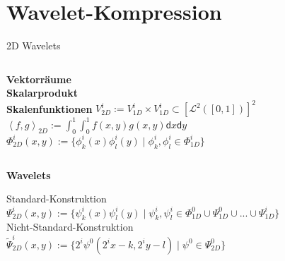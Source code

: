 \section{Wavelet-Kompression}

	\begin{frame}{2D Wavelets}
		\begin{columns}[T,onlytextwidth]
			{\bf Vektorräume}\vspace{3mm}\\
			{\bf Skalarprodukt}\vspace{3mm}\\
			{\bf Skalenfunktionen}
			\vspace{-1mm}
			$V^i_{2D}:= V^i_{1D}\times V^i_{1D}\subset\left[ \mathcal{L}^2([0,1])\right]^2$\vspace{3mm}\\
			$\left\langle f, g\right\rangle _{2D}:=\int_{0}^{1}\int_{0}^{1}f(x,y)g(x,y)\mathsf{d}x\mathsf{d}y$\vspace{3mm}\\
			$\Phi^i_{2D}(x, y):=\{\phi^i_k(x)\phi^i_l(y)\mid \phi^i_k, \phi^i_l\in\Phi^i_{1D} \}$
		\end{columns}\vspace{4mm}\pause
		\begin{center}
				\bf Wavelets\vspace{-4mm}
		\end{center}
		\alert{Standard-Konstruktion}\vspace{1mm}\\
		\hspace{12mm}$\Psi^i_{2D}(x, y):=\{\psi^i_k(x)\psi^i_l(y)\mid \psi^i_k,\psi^i_l\in\Phi_{1D}^0\cup\Psi_{1D}^0\cup...\cup\Psi_{1D}^{i} \}$\vspace{3mm}\\ \pause
		\alert{Nicht-Standard-Konstruktion}\vspace{1mm}\\
		\hspace{12mm}$\tilde\Psi^i_{2D}(x, y):=\{2^i\psi^0(2^ix-k, 2^iy-l)\mid \psi^0 \in \Psi^0_{2D}\}$
	\end{frame}

